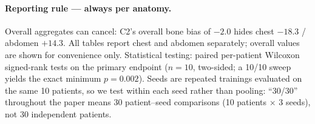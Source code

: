\paragraph{Reporting rule --- always per anatomy.}
Overall aggregates can cancel: C2's overall bone bias of $-2.0$\hu{} hides chest $-18.3$ / abdomen $+14.3$\hu{}. All tables report chest and abdomen separately; overall values are shown for convenience only. Statistical testing: paired per-patient Wilcoxon signed-rank tests on the primary endpoint ($n = 10$, two-sided; a 10/10 sweep yields the exact minimum $p = 0.002$). Seeds are repeated trainings evaluated on the same 10 patients, so we test within each seed rather than pooling: ``30/30'' throughout the paper means 30 patient--seed comparisons (10 patients $\times$ 3 seeds), not 30 independent patients.
